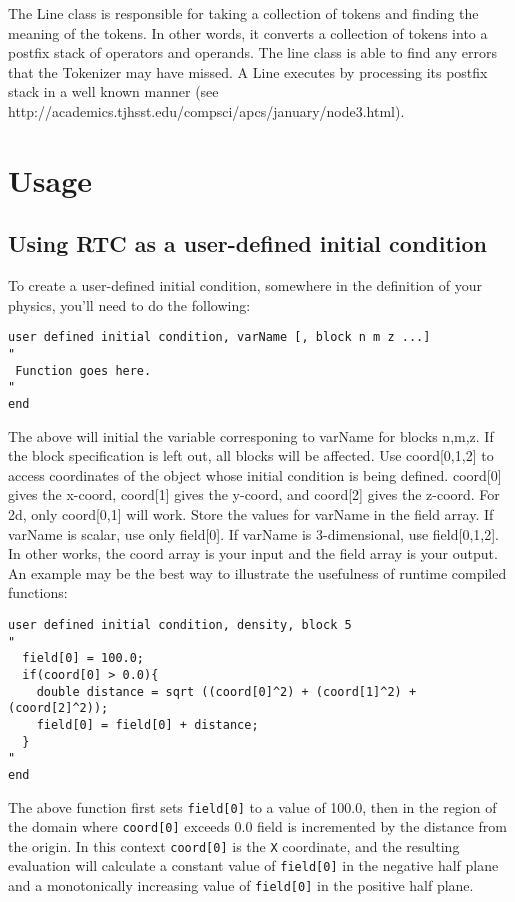 \documentclass{article}
\begin{document}
\noindent
The Line class is responsible for taking a collection of tokens and finding
the meaning of the tokens. In other words, it converts a collection of tokens
into a postfix stack of operators and operands. The line class is able to find
any errors that the Tokenizer may have missed. A Line executes by processing
its postfix stack in a well known manner
(see http://academics.tjhsst.edu/compsci/apcs/january/node3.html).

\section{Usage}

\subsection{Using RTC as a user-defined initial condition}

To create a user-defined initial condition, somewhere in the definition of
your physics, you'll need to do the following:

{\ttfamily \begin{verbatim}
user defined initial condition, varName [, block n m z ...]
"
 Function goes here.
"
end
\end{verbatim} }

\noindent
The above will initial the variable corresponing to varName for blocks n,m,z.
If the block specification is left out, all blocks will be affected.
Use coord[0,1,2] to access coordinates of the object whose initial condition
is being defined. coord[0] gives the x-coord, coord[1] gives the y-coord, and
coord[2] gives the z-coord. For 2d, only coord[0,1] will work. Store the
values for varName in the field array. If varName is scalar, use only field[0].
If varName is 3-dimensional, use field[0,1,2]. In other works, the coord array
is your input and the field array is your output.\\

\noindent
An example may be the best way to illustrate the usefulness of runtime
compiled functions:

{\ttfamily \begin{verbatim}
user defined initial condition, density, block 5
"
  field[0] = 100.0;
  if(coord[0] > 0.0){
    double distance = sqrt ((coord[0]^2) + (coord[1]^2) + (coord[2]^2));
    field[0] = field[0] + distance;
  }
"
end
\end{verbatim} }
\noindent
The above function first sets \texttt{field[0]} to a value of 100.0, then in
the region of the domain where \texttt{coord[0]} exceeds 0.0 field is
incremented by the distance from the origin. In this context \texttt{coord[0]}
is the \texttt{X} coordinate, and the resulting evaluation will calculate a
constant value of \texttt{field[0]} in the negative half plane and a
monotonically increasing value of \texttt{field[0]} in the positive half plane.\\
\end{document}
